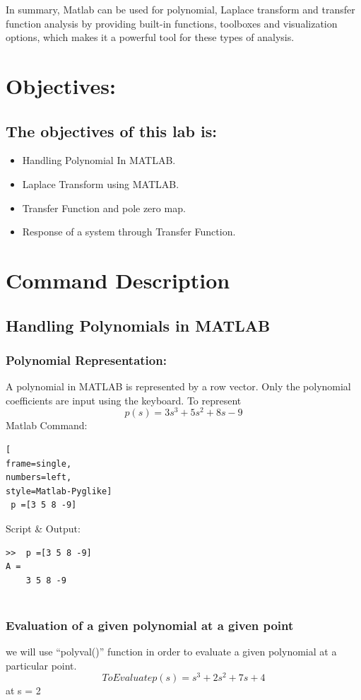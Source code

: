 \documentclass[conference]{IEEEtran}
\begin{document}
In summary, Matlab can be used for polynomial, Laplace transform and transfer function analysis by providing built-in functions, toolboxes and visualization options, which makes it a powerful tool for these types of analysis.

\section{Objectives:}

\subsection{The objectives of this lab is:}

\begin{itemize}
    \item  Handling Polynomial In MATLAB.
    \item Laplace Transform 
    using MATLAB.
    \item Transfer Function and pole zero map.
    \item  Response of a system through Transfer Function.
\end{itemize}
 


\section{Command Description}
\subsection{Handling Polynomials in MATLAB}
\subsubsection{Polynomial Representation:}
A polynomial in MATLAB is represented 
by a row vector. Only the polynomial 
coefficients are input using the keyboard.
To represent 
$$ p(s) =3s^3 + 5s^2 + 8s -9 $$
Matlab Command:
\begin{lstlisting}[
frame=single,
numbers=left,
style=Matlab-Pyglike]
 p =[3 5 8 -9]

\end{lstlisting}
Script \& Output:
\begin{verbatim}
>>  p =[3 5 8 -9]
A =
    3 5 8 -9
    
\end{verbatim}

\subsubsection{Evaluation of a given polynomial at a 
given point}
we will use “polyval()” function in 
order to evaluate a given polynomial at a 
particular point.
$$ To Evaluate p(s) = s^3 + 2s^2 + 7s + 4 $$ 
at s = 2
\end{document}
